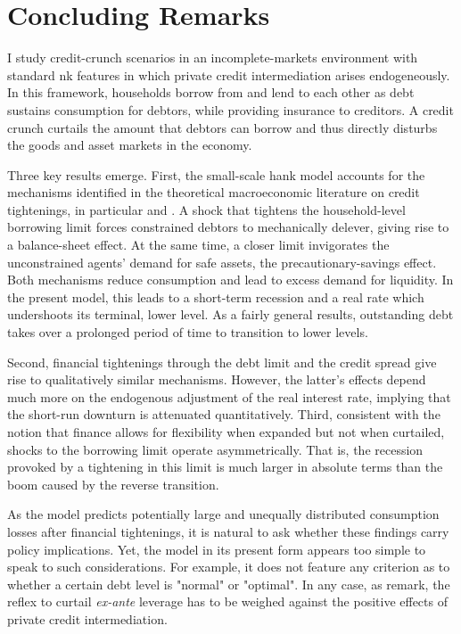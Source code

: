 \documentclass[a4paper,12pt]{article} %
\numberwithin{equation}{section} %
\numberwithin{figure}{section}
\numberwithin{table}{section}
\begin{document}
\section{Concluding Remarks}
\label{sec:conclusion}

I study credit-crunch scenarios in an incomplete-markets environment with standard \Gls{nk} features in which private credit intermediation arises endogeneously. In this framework, households borrow from and lend to each other as debt sustains consumption for debtors, while providing insurance to creditors. A credit crunch curtails the amount that debtors can borrow and thus directly disturbs the goods and asset markets in the economy. 

Three key results emerge. First, the small-scale \Gls{hank} model accounts for the mechanisms identified in the theoretical macroeconomic literature on credit tightenings, in particular \textcite{egg2012} and \textcite{gl2017}. A shock that tightens the household-level borrowing limit forces constrained debtors to mechanically delever, giving rise to a balance-sheet effect. At the same time, a closer limit invigorates the unconstrained agents' demand for safe assets, the precautionary-savings effect. Both mechanisms reduce consumption and lead to excess demand for liquidity. In the present model, this leads to a short-term recession and a real rate which undershoots its terminal, lower level. As a fairly general results, outstanding debt takes over a prolonged period of time to transition to lower levels.

Second, financial tightenings through the debt limit and the credit spread give rise to qualitatively similar mechanisms. However, the latter's effects depend much more on the endogenous adjustment of the real interest rate, implying that the short-run downturn is attenuated quantitatively. Third, consistent with the notion that finance allows for flexibility when expanded but not when curtailed, shocks to the borrowing limit operate asymmetrically. That is, the recession provoked by a tightening in this limit is much larger in absolute terms than the boom caused by the reverse transition.

As the model predicts potentially large and unequally distributed consumption losses after financial tightenings, it is natural to ask whether these findings carry policy implications. Yet, the model in its present form appears too simple to speak to such considerations. For example, it does not feature any criterion as to whether a certain debt level is "normal" or "optimal". In any case, as \textcite{korinek2016} remark, the reflex to curtail \textit{ex-ante} leverage has to be weighed against the positive effects of private credit intermediation. 
\end{document}
